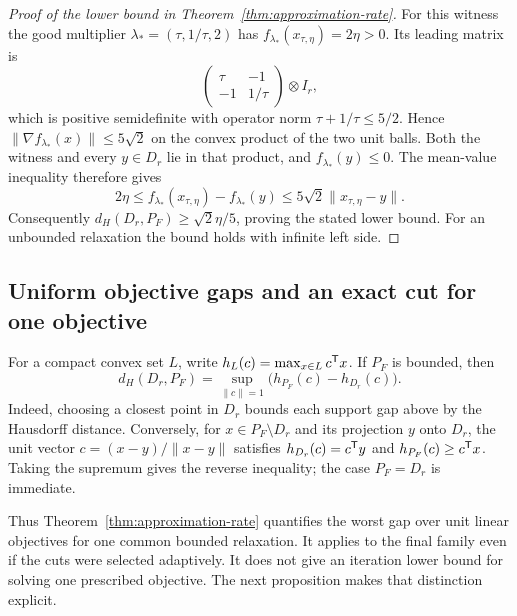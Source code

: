 \begin{proof}[Proof of the lower bound in Theorem~\ref{thm:approximation-rate}]
For this witness the good multiplier
$\lambda_*=(\tau,1/\tau,2)$ has
$f_{\lambda_*}(x_{\tau,\eta})=2\eta>0$. Its leading matrix is
\[
 \begin{pmatrix}\tau&-1\\-1&1/\tau\end{pmatrix}\otimes I_r,
\]
which is positive semidefinite with operator norm
$\tau+1/\tau\leq5/2$. Hence
$\|\nabla f_{\lambda_*}(x)\|\leq5\sqrt2$ on the convex product
of the two unit balls. Both the witness and every $y\in D_r$
lie in that product, and $f_{\lambda_*}(y)\leq0$. The mean-value
inequality therefore gives
\[
 2\eta\leq f_{\lambda_*}(x_{\tau,\eta})-f_{\lambda_*}(y)
 \leq5\sqrt2\|x_{\tau,\eta}-y\|.
\]
Consequently
$d_H(D_r,P_F)\geq\sqrt2\eta/5$, proving the stated lower bound.
For an unbounded relaxation the bound holds with infinite left side.
\end{proof}

\subsection{Uniform objective gaps and an exact cut for one objective}

For a compact convex set $L$, write
$h_L(c)=\max_{x\in L}c^{\mathsf T} x$. If $P_F$ is bounded, then
\begin{equation}\label{eq:hausdorff-support}
 d_H(D_r,P_F)=\sup_{\|c\|=1}\bigl(h_{P_F}(c)-h_{D_r}(c)\bigr).
\end{equation}
Indeed, choosing a closest point in $D_r$ bounds each support gap
above by the Hausdorff distance. Conversely, for $x\in P_F\setminus
D_r$ and its projection $y$ onto $D_r$, the unit vector
$c=(x-y)/\|x-y\|$ satisfies $h_{D_r}(c)=c^{\mathsf T} y$ and
$h_{P_F}(c)\geq c^{\mathsf T} x$. Taking the supremum gives the
reverse inequality; the case $P_F=D_r$ is immediate.

Thus Theorem~\ref{thm:approximation-rate} quantifies the worst gap
over unit linear objectives for one common bounded relaxation.
It applies to the final family even if the cuts were selected adaptively.
It does not give an iteration lower bound for solving one prescribed
objective. The next proposition makes that distinction explicit.

